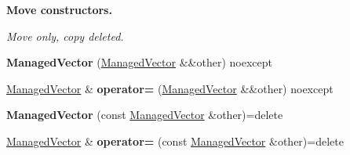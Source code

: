 \begin{Indent}\textbf{ Move constructors.}\par
{\em Move only, copy deleted. }\begin{DoxyCompactItemize}
\item 
\mbox{\label{classblaze_1_1util_1_1ManagedVector_a7adbb2075c32b994dc754c85ee26e6cf}} 
{\bfseries Managed\+Vector} (\hyperlink{classblaze_1_1util_1_1ManagedVector}{Managed\+Vector} \&\&other) noexcept
\item 
\mbox{\label{classblaze_1_1util_1_1ManagedVector_a529111d90cb99830593a33040b80649f}} 
\hyperlink{classblaze_1_1util_1_1ManagedVector}{Managed\+Vector} \& {\bfseries operator=} (\hyperlink{classblaze_1_1util_1_1ManagedVector}{Managed\+Vector} \&\&other) noexcept
\item 
\mbox{\label{classblaze_1_1util_1_1ManagedVector_a19024b89094d90c347541fcdb649fd73}} 
{\bfseries Managed\+Vector} (const \hyperlink{classblaze_1_1util_1_1ManagedVector}{Managed\+Vector} \&other)=delete
\item 
\mbox{\label{classblaze_1_1util_1_1ManagedVector_a20abfd602f5ba16e8e6695c130c11aae}} 
\hyperlink{classblaze_1_1util_1_1ManagedVector}{Managed\+Vector} \& {\bfseries operator=} (const \hyperlink{classblaze_1_1util_1_1ManagedVector}{Managed\+Vector} \&other)=delete
\end{DoxyCompactItemize}
\end{Indent}
